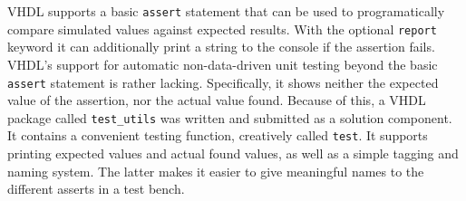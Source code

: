 
VHDL supports a basic \texttt{assert} statement that can be used to programatically compare simulated values against expected results. With the optional \texttt{report} keyword it can additionally print a string to the console if the assertion fails.
VHDL's support for automatic non-data-driven unit testing beyond the basic \texttt{assert} statement is rather lacking.
Specifically, it shows neither the expected value of the assertion, nor the actual value found.
Because of this, a VHDL package called \texttt{test\_utils} was written and submitted as a solution component.
It contains a convenient testing function, creatively called \texttt{test}.
It supports printing expected values and actual found values, as well as a simple tagging and naming system.
The latter makes it easier to give meaningful names to the different asserts in a test bench.
